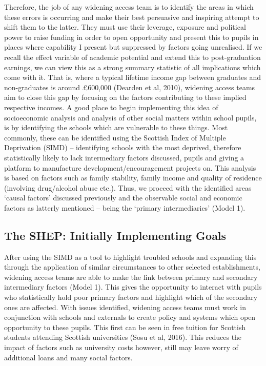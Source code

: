 \documentclass[11pt, english]{article}
\begin{document}
	Therefore, the job of any widening access team is to identify the areas in which these errors is occurring and make their best persuasive and inspiring attempt to shift them to the latter. They must use their leverage, exposure and political power to raise funding in order to open opportunity and present this to pupils in places where capability I present but suppressed by factors going unrealised. If we recall the effect variable of academic potential and extend this to post-graduation earnings, we can view this as a strong summary statistic of all implications which come with it. That is, where a typical lifetime income gap between graduates and non-graduates is around £600,000  (Dearden et al, 2010), widening access teams aim to close this gap by focusing on the factors contributing to these implied respective incomes. A good place to begin implementing this idea of socioeconomic analysis and analysis of other social matters within school pupils, is by identifying the schools which are vulnerable to these things. Most commonly, these can be identified using the Scottish Index of Multiple Deprivation (SIMD) – identifying schools with the most deprived, therefore statistically likely to lack intermediary factors discussed, pupils and giving a platform to manufacture development/encouragement projects on. This analysis is based on factors such as family stability, family income and quality of residence (involving drug/alcohol abuse etc.). Thus, we proceed with the identified areas ‘causal factors’ discussed previously and the observable social and economic factors as latterly mentioned – being the ‘primary intermediaries’ (Model 1).

	\subsection{The SHEP: Initially Implementing Goals}

	After using the SIMD as a tool to highlight troubled schools and expanding this through the application of similar circumstances to other selected establishments, widening access teams are able to make the link between primary and secondary intermediary factors (Model 1). This gives the opportunity to interact with pupils who statistically hold poor primary factors and highlight which of the secondary ones are affected. With issues identified, widening access teams must work in conjunction with schools and externals to create policy and systems which open opportunity to these pupils. This first can be seen in free tuition for Scottish students attending Scottish universities (Sosu et al, 2016). This reduces the impact of factors such as university costs however, still may leave worry of additional loans and many social factors.\\
\end{document}
